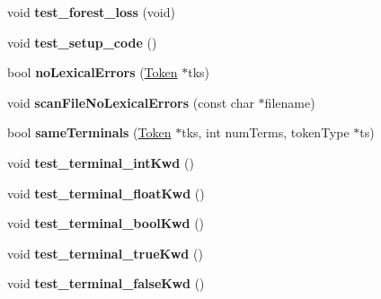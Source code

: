 \begin{DoxyCompactItemize}
\item 
\hypertarget{classScannerTestSuite_a683cfbeb129ac2f966693c37a9358e06}{void {\bfseries test\-\_\-forest\-\_\-loss} (void)}\label{classScannerTestSuite_a683cfbeb129ac2f966693c37a9358e06}

\item 
\hypertarget{classScannerTestSuite_ade832b9b4b3bd92980d43c4050cebd2c}{void {\bfseries test\-\_\-setup\-\_\-code} ()}\label{classScannerTestSuite_ade832b9b4b3bd92980d43c4050cebd2c}

\item 
\hypertarget{classScannerTestSuite_a681db679ec2418f862f478fa7678942b}{bool {\bfseries no\-Lexical\-Errors} (\hyperlink{classToken}{Token} $\ast$tks)}\label{classScannerTestSuite_a681db679ec2418f862f478fa7678942b}

\item 
\hypertarget{classScannerTestSuite_a01dc6065a02127accc049627ae234129}{void {\bfseries scan\-File\-No\-Lexical\-Errors} (const char $\ast$filename)}\label{classScannerTestSuite_a01dc6065a02127accc049627ae234129}

\item 
\hypertarget{classScannerTestSuite_a97c50725866b3a5b36c36488053a59bc}{bool {\bfseries same\-Terminals} (\hyperlink{classToken}{Token} $\ast$tks, int num\-Terms, token\-Type $\ast$ts)}\label{classScannerTestSuite_a97c50725866b3a5b36c36488053a59bc}

\item 
\hypertarget{classScannerTestSuite_af42f8338bfe7b397ea39f565157f64cc}{void {\bfseries test\-\_\-terminal\-\_\-int\-Kwd} ()}\label{classScannerTestSuite_af42f8338bfe7b397ea39f565157f64cc}

\item 
\hypertarget{classScannerTestSuite_a5c55d99dbc84996abd740fbabb36314b}{void {\bfseries test\-\_\-terminal\-\_\-float\-Kwd} ()}\label{classScannerTestSuite_a5c55d99dbc84996abd740fbabb36314b}

\item 
\hypertarget{classScannerTestSuite_a919ec02392d67e0932affc229b1e72c8}{void {\bfseries test\-\_\-terminal\-\_\-bool\-Kwd} ()}\label{classScannerTestSuite_a919ec02392d67e0932affc229b1e72c8}

\item 
\hypertarget{classScannerTestSuite_a88607da81181c529df9b9edf246dfff6}{void {\bfseries test\-\_\-terminal\-\_\-true\-Kwd} ()}\label{classScannerTestSuite_a88607da81181c529df9b9edf246dfff6}

\item 
\hypertarget{classScannerTestSuite_a6a4395c74f53b0ff0024d6a81999d1b4}{void {\bfseries test\-\_\-terminal\-\_\-false\-Kwd} ()}\label{classScannerTestSuite_a6a4395c74f53b0ff0024d6a81999d1b4}


\end{DoxyCompactItemize}
